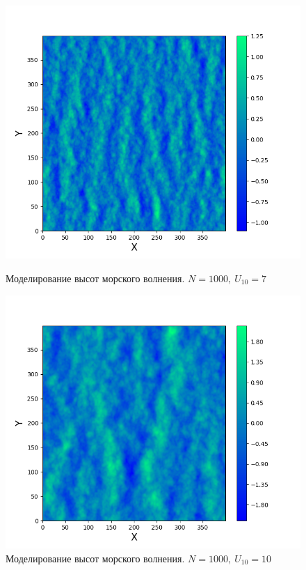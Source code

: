 \begin{figure}[h!]
\vfill
\begin{minipage}[h]{0.45\linewidth}
	\centering
	\includegraphics[width=\linewidth]{img/water7.png}
	\caption{Моделирование высот морского волнения. $N=1000, ~ U_{10}=7$  }
	\label{fig:water7}
\end{minipage}
\hfill
\begin{minipage}[h]{0.45\linewidth}
	\centering
	\includegraphics[width=\linewidth]{img/water10.png}
	\caption{Моделирование высот морского волнения. $N=1000, ~ U_{10}=10$ }
	\label{fig:water10}
\end{minipage}
\end{figure}



